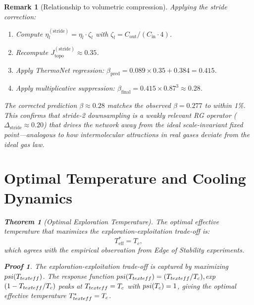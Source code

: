 \documentclass[11pt, a4paper]{article}
\newtheorem{theo}{Theorem}[section]
\theoremstyle{plain}
\newtheorem*{remark}{Remark}
\newtheorem*{pf}{Proof}
\begin{document}
\begin{remark}[Relationship to volumetric compression]
Applying the stride correction:
\begin{enumerate}
    \item Compute $\eta_l^{(\mathrm{stride})} = \eta_l \cdot \zeta_l$ with $\zeta_l = C_{\mathrm{out}}/(C_{\mathrm{in}} \cdot 4)$.
    \item Recompute $J_{\mathrm{topo}}^{(\mathrm{stride})} \approx 0.35$.
    \item Apply ThermoNet regression: $\beta_{\mathrm{pred}} = 0.089 \times 0.35 + 0.384 = 0.415$.
    \item Apply multiplicative suppression: $\beta_{\mathrm{final}} = 0.415 \times 0.87^3 \approx 0.28$.
\end{enumerate}

The corrected prediction $\beta \approx 0.28$ matches the observed $\beta = 0.277$ to within 1\%. This confirms that stride-2 downsampling is a weakly relevant RG operator ($\Delta_{\mathrm{stride}} \approx 0.20$) that drives the network away from the ideal scale-invariant fixed point---analogous to how intermolecular attractions in real gases deviate from the ideal gas law.

\section{Optimal Temperature and Cooling Dynamics}

\begin{theo}[Optimal Exploration Temperature]\label{theo:optimal_temp}
The optimal effective temperature that maximizes the exploration-exploitation trade-off is:
\begin{equation}
T_{\text{eff}}^* = T_c,
\end{equation}
which agrees with the empirical observation from Edge of Stability experiments.
\end{theo}
\begin{pf}
The exploration-exploitation trade-off is captured by maximizing $\\psi(T_{\\text{eff}})$. The response function $\\psi(T_{\\text{eff}}) = (T_{\\text{eff}}/T_c)\\,$exp$(1-T_{\\text{eff}}/T_c)$ peaks at $T_{\\text{eff}}=T_c$ with $\\psi(T_c)=1$, giving the optimal effective temperature $T_{\\text{eff}}^* = T_c$.
\end{pf}


\end{remark}
\end{document}
